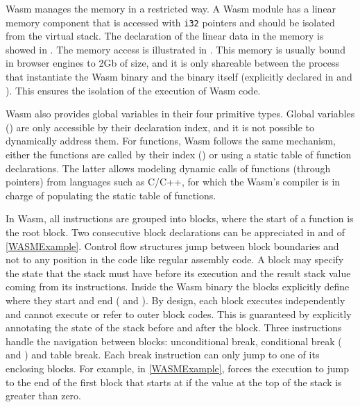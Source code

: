 Wasm  manages the memory in a restricted way. A Wasm  module has a linear memory component that is accessed with \texttt{i32} pointers and should be isolated from the virtual stack. The declaration of the linear data in the memory is showed in . The memory access is illustrated in . This memory is usually bound in browser engines to 2Gb of size, and it is only shareable between the process that instantiate the Wasm  binary and the binary itself (explicitly declared in  and ). This ensures the isolation of the execution of Wasm  code. 

Wasm  also provides global variables in their four primitive types. Global variables () are only accessible by their declaration index, and it is not possible to dynamically address them. For functions, Wasm  follows the same mechanism, either the functions are called by their index () or using a static table of function declarations. The latter allows modeling dynamic calls of functions (through pointers) from languages such as C/C++, for which the Wasm's compiler is in charge of populating the static table of functions.


In Wasm, all instructions are grouped into blocks, where the start of a function is the root block. Two consecutive block declarations can be appreciated in  and  of \autoref{WASMExample}. Control flow structures jump between block boundaries and not to any position in the code like regular assembly code. A block may specify the state that the stack must have before its execution and the result stack value coming from its instructions. Inside the Wasm  binary the blocks explicitly define where they start and end ( and ). By design, each block executes independently and cannot execute or refer to outer block codes. This is guaranteed by explicitly annotating the state of the stack before and after the block. Three instructions handle the navigation between blocks: unconditional break, conditional break ( and ) and table break. Each break instruction can only jump to one of its enclosing blocks. For example, in \autoref{WASMExample},  forces the execution to jump to the end of the first block that starts at  if the value at the top of the stack is greater than zero.


